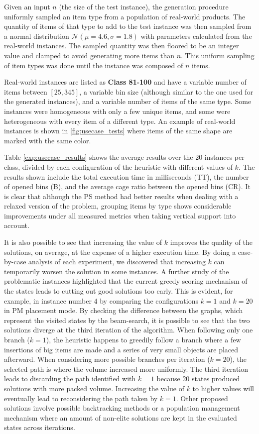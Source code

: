 Given an input $n$ (the size of the test instance), the generation procedure uniformly sampled an item type from a population of real-world products.
The quantity of items of that type to add to the test instance was then sampled from a normal distribution $\mathcal{N}(\mu = 4.6, \sigma = 1.8)$ with parameters calculated from the real-world instances.
The sampled quantity was then floored to be an integer value and clamped to avoid generating more items than $n$.
This uniform sampling of item types was done until the instance was composed of $n$ items.

Real-world instances are listed as \textbf{Class 81-100} and have a variable number of items between $[25, 345]$, a variable bin size (although similar to the one used for the generated instances), and a variable number of items of the same type. Some instances were homogeneous with only a few unique items, and some were heterogeneous with every item of a different type.
An example of real-world instances is shown in \cref{fig:usecase_tests} where items of the same shape are marked with the same color.

Table \ref{exp:usecase_results} shows the average results over the 20 instances per class, divided by each configuration of the heuristic with different values of $k$.
The results shown include the total execution time in milliseconds (TT), the number of opened bins (B), and the average cage ratio between the opened bins (CR).
It is clear that although the PS method had better results when dealing with a relaxed version of the problem, grouping items by type shows considerable improvements under all measured metrics when taking vertical support into account.

It is also possible to see that increasing the value of $k$ improves the quality of the solutions, on average, at the expense of a higher execution time.
By doing a case-by-case analysis of each experiment, we discovered that increasing $k$ can temporarily worsen the solution in some instances.
A further study of the problematic instances highlighted that the current greedy scoring mechanism of the states leads to cutting out good solutions too early.
This is evident, for example, in instance number 4 by comparing the configurations $k=1$ and $k=20$ in PM placement mode.
By checking the difference between the graphs, which represent the visited states by the beam-search, it is possible to see that the two solutions diverge at the third iteration of the algorithm.
When following only one branch ($k=1$), the heuristic happens to greedily follow a branch where a few insertions of big items are made and a series of very small objects are placed afterward.
When considering more possible branches per iteration ($k=20$), the selected path is where the volume increased more uniformly. The third iteration leads to discarding the path identified with $k=1$ because 20 states produced solutions with more packed volume.
Increasing the value of $k$ to higher values will eventually lead to reconsidering the path taken by $k=1$. Other proposed solutions involve possible backtracking methods or a population management mechanism where an amount of non-elite solutions are kept in the evaluated states across iterations.

